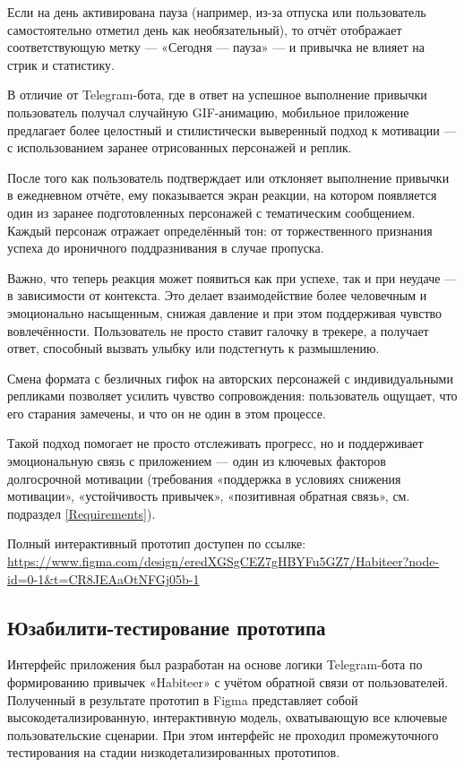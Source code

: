 \documentclass[pdflatex,sn-mathphys-num]{sn-jnl}%
\theoremstyle{thmstyleone}%
\theoremstyle{thmstyletwo}%
\theoremstyle{thmstylethree}%
\begin{document}
Если на день активирована пауза (например, из-за отпуска или пользователь самостоятельно отметил день как необязательный), то отчёт отображает соответствующую метку — «Сегодня — пауза» — и привычка не влияет на стрик и статистику.

В отличие от Telegram-бота, где в ответ на успешное выполнение привычки пользователь получал случайную GIF-анимацию, мобильное приложение предлагает более целостный и стилистически выверенный подход к мотивации — с использованием заранее отрисованных персонажей и реплик.

После того как пользователь подтверждает или отклоняет выполнение привычки в ежедневном отчёте, ему показывается экран реакции, на котором появляется один из заранее подготовленных персонажей с тематическим сообщением. Каждый персонаж отражает определённый тон: от торжественного признания успеха до ироничного поддразнивания в случае пропуска.

Важно, что теперь реакция может появиться как при успехе, так и при неудаче — в зависимости от контекста. Это делает взаимодействие более человечным и эмоционально насыщенным, снижая давление и при этом поддерживая чувство вовлечённости. Пользователь не просто ставит галочку в трекере, а получает ответ, способный вызвать улыбку или подстегнуть к размышлению.

Смена формата с безличных гифок на авторских персонажей с индивидуальными репликами позволяет усилить чувство сопровождения: пользователь ощущает, что его старания замечены, и что он не один в этом процессе.

Такой подход помогает не просто отслеживать прогресс, но и поддерживает эмоциональную связь с приложением — один из ключевых факторов долгосрочной мотивации (требования «поддержка в условиях снижения мотивации», «устойчивость привычек», «позитивная обратная связь», см. подраздел \ref{Requirements}).

\medskip

\noindent Полный интерактивный прототип доступен по ссылке:
\url{https://www.figma.com/design/eredXGSgCEZ7gHBYFu5GZ7/Habiteer?node-id=0-1&t=CR8JEAaOtNFGj05b-1}

\subsection{Юзабилити-тестирование прототипа}

Интерфейс приложения был разработан на основе логики Telegram-бота по формированию привычек «Habiteer» с учётом обратной связи от пользователей. Полученный в результате прототип в Figma представляет собой высокодетализированную, интерактивную модель, охватывающую все ключевые пользовательские сценарии. При этом интерфейс не проходил промежуточного тестирования на стадии низкодетализированных прототипов.
\end{document}
